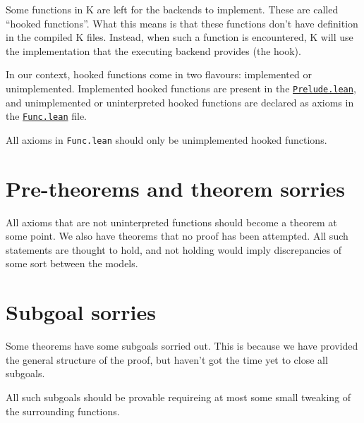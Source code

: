 Some functions in K are left for the backends to implement. These are called
``hooked functions''. What this means is that these functions don't have
definition in the compiled K files. Instead, when such a function is
encountered, K will use the implementation that the executing backend provides
(the hook).

In our context, hooked functions come in two flavours: implemented or
unimplemented. Implemented hooked functions are present in the
\href{https://runtimeverification.github.io/evm-equivalence/docs/EvmEquivalence/KEVM2Lean/Prelude.html}{\texttt{Prelude.lean}},
and unimplemented or uninterpreted hooked functions are declared as axioms in
the
\href{https://runtimeverification.github.io/evm-equivalence/docs/EvmEquivalence/KEVM2Lean/Func.html}{\texttt{Func.lean}}
file.

All axioms in \texttt{Func.lean} should only be unimplemented hooked functions.

\section{Pre-theorems and theorem sorries}

All axioms that are not uninterpreted functions should become a theorem at some
point. We also have theorems that no proof has been attempted. All such
statements are thought to hold, and not holding would imply discrepancies of
some sort between the models.

\section{Subgoal sorries}

Some theorems have some subgoals sorried out. This is because we have
provided the general structure of the proof, but haven't got the time yet to
close all subgoals.

All such subgoals should be provable requireing at most some small tweaking of
the surrounding functions.
